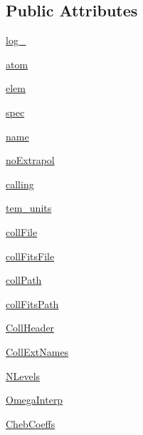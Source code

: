 \subsection*{Public Attributes}
\begin{DoxyCompactItemize}
\item 
\hyperlink{classpyneb_1_1core_1_1pynebcore_1_1___coll_data_fits_a42f3e78e841a8714f2602866843d77da}{log\+\_\+}
\item 
\hyperlink{classpyneb_1_1core_1_1pynebcore_1_1___coll_data_fits_a8bbd2e846954f94878e90ebdf0e51772}{atom}
\item 
\hyperlink{classpyneb_1_1core_1_1pynebcore_1_1___coll_data_fits_ac34163e88a48564f05f1cf5aa8d4683a}{elem}
\item 
\hyperlink{classpyneb_1_1core_1_1pynebcore_1_1___coll_data_fits_a781126fa0e5b9bb0a4f6ae5afe4fd9a9}{spec}
\item 
\hyperlink{classpyneb_1_1core_1_1pynebcore_1_1___coll_data_fits_a40d926369df2d46e0799a66e4c9d9a73}{name}
\item 
\hyperlink{classpyneb_1_1core_1_1pynebcore_1_1___coll_data_fits_a97b30abb66948d40dc2077a3c3b15231}{no\+Extrapol}
\item 
\hyperlink{classpyneb_1_1core_1_1pynebcore_1_1___coll_data_fits_a43c9d096f9508cb475cb4fc3552e1979}{calling}
\item 
\hyperlink{classpyneb_1_1core_1_1pynebcore_1_1___coll_data_fits_a0ec412b766393f099d604527da57c565}{tem\+\_\+units}
\item 
\hyperlink{classpyneb_1_1core_1_1pynebcore_1_1___coll_data_fits_a2f7b35cc563095fb2a894b2cc994cfe5}{coll\+File}
\item 
\hyperlink{classpyneb_1_1core_1_1pynebcore_1_1___coll_data_fits_ae3c29d8fc35102d34f04c618f578cd86}{coll\+Fits\+File}
\item 
\hyperlink{classpyneb_1_1core_1_1pynebcore_1_1___coll_data_fits_ad08da92d019bbc87139f04fb7d765411}{coll\+Path}
\item 
\hyperlink{classpyneb_1_1core_1_1pynebcore_1_1___coll_data_fits_a6a16fc5f5206b988d99be1511d158ada}{coll\+Fits\+Path}
\item 
\hyperlink{classpyneb_1_1core_1_1pynebcore_1_1___coll_data_fits_ac869d4a1a70ad7d42881b0e19a69ab4c}{Coll\+Header}
\item 
\hyperlink{classpyneb_1_1core_1_1pynebcore_1_1___coll_data_fits_a5526868efdb550fee08608f77262b106}{Coll\+Ext\+Names}
\item 
\hyperlink{classpyneb_1_1core_1_1pynebcore_1_1___coll_data_fits_a64b97a86b4dfb53e4cba3ce8ac0fdf00}{N\+Levels}
\item 
\hyperlink{classpyneb_1_1core_1_1pynebcore_1_1___coll_data_fits_a3e15df449393d23d1ac760671b5828cc}{Omega\+Interp}
\item 
\hyperlink{classpyneb_1_1core_1_1pynebcore_1_1___coll_data_fits_af8eaa90b2ddbf77c0a78b648e9f66971}{Cheb\+Coeffs}
\end{DoxyCompactItemize}
